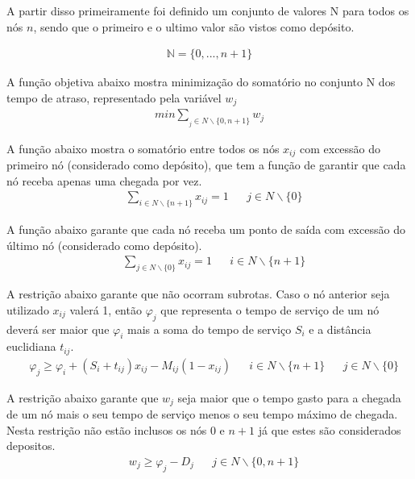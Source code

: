 \documentclass[12pt]{article}
\begin{document}
    A partir disso primeiramente foi definido um conjunto de valores N para todos os nós $n$, sendo que o primeiro e o ultimo valor são vistos como depósito.
    
    \begin{align}
        \mathbb{N} = \{0, ..., n+1\}
    \end{align}
    
    A função objetiva abaixo mostra minimização do somatório no conjunto N dos tempo de atraso, representado pela variável $w_j$
    \begin{align}
        min        \sum_{_j\in N\backslash \{0,n+1\}} w_j \label{eq1}
    \end{align}
    
    A função abaixo mostra o somatório entre todos os nós $x_{ij}$ com excessão do primeiro nó (considerado como depósito), que tem a função de garantir que cada nó receba apenas uma chegada por vez.
    \begin{align}
      & \sum_{i\in N\backslash \{n+1\}} x_{ij} = 1                         &    & j\in N\backslash \{0\}
    \end{align}
    
    A função abaixo garante que cada nó receba um ponto de saída com excessão do último nó (considerado como depósito).
    \begin{align}
      & \sum_{j\in N\backslash \{0\}} x_{ij} = 1                           &               & i\in N\backslash \{n+1\}  
    \end{align}
    
    A restrição abaixo garante que não ocorram subrotas. Caso o nó anterior seja utilizado $x_{ij}$ valerá 1, então $\varphi_j$ que representa o tempo de serviço de um nó deverá ser maior que $\varphi_i$ mais a soma do tempo de serviço $S_i$ e a distância euclidiana $t_{ij}$.
    \begin{align}
      & \varphi_j \geq \varphi_i + (S_i + t_{ij})x_{ij} - M_{ij}(1-x_{ij}) & \label{eq3}    & i\in N\backslash \{n+1\}   &  & j\in N\backslash \{0\} 
    \end{align}
    
    A restrição abaixo garante que $w_j$ seja maior que o tempo gasto para a chegada de um nó mais o seu tempo de serviço menos o seu tempo máximo de chegada. Nesta restrição não estão inclusos os nós $0$ e $n+1$ já que estes são considerados depositos.
    \begin{align}
      & w_j \geq \varphi_j - D_j                                           & \label{eq4}    & j\in N\backslash \{0,n+1\}    
    \end{align}
    
\end{document}
